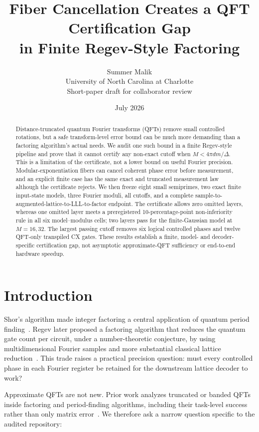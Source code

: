 \documentclass[10pt,twocolumn]{article}
\title{Fiber Cancellation Creates a QFT Certification Gap\\
in Finite Regev-Style Factoring}
\author{Summer Malik\\
University of North Carolina at Charlotte\\
\small Short-paper draft for collaborator review}
\date{July 2026}
\begin{document}
\maketitle

\begin{abstract}
Distance-truncated quantum Fourier transforms (QFTs) remove small controlled
rotations, but a safe transform-level error bound can be much more demanding
than a factoring algorithm's actual needs.  We audit one such bound in a
finite Regev-style pipeline and prove that it cannot certify any non-exact
cutoff when $M<4\pi dm/\Delta$.  This is a limitation of the certificate, not
a lower bound on useful Fourier precision.  Modular-exponentiation fibers can
cancel coherent phase error before measurement, and an explicit finite case
has the same exact and truncated measurement law although the certificate
rejects.  We then freeze eight small semiprimes, two exact finite input-state
models, three Fourier moduli, all cutoffs, and a complete
sample-to-augmented-lattice-to-LLL-to-factor endpoint.  The certificate allows
zero omitted layers, whereas one omitted layer meets a preregistered
10-percentage-point non-inferiority rule in all six model--modulus cells; two
layers pass for the finite-Gaussian model at $M=16,32$.  The largest passing
cutoff removes six logical controlled phases and twelve QFT-only transpiled
CX gates.  These results establish a finite, model- and decoder-specific
certification gap, not asymptotic approximate-QFT sufficiency or end-to-end
hardware speedup.
\end{abstract}

\section{Introduction}

Shor's algorithm made integer factoring a central application of quantum
period finding~\cite{Shor1994,Shor1997}.  Regev later proposed a factoring
algorithm that reduces the quantum gate count per circuit, under a
number-theoretic conjecture, by using multidimensional Fourier samples and
more substantial classical lattice reduction~\cite{Regev2025}.  This trade
raises a practical precision question: must every controlled phase in each
Fourier register be retained for the downstream lattice decoder to work?

Approximate QFTs are not new.  Prior work analyzes truncated or banded QFTs
inside factoring and period-finding algorithms, including their task-level
success rather than only matrix error~\cite{Coppersmith1994,BarencoEtAl1996,
FowlerHollenberg2004,NamBlumel2012,NamBlumel2013}.  We therefore ask a narrow
question specific to the audited repository:
\end{document}
